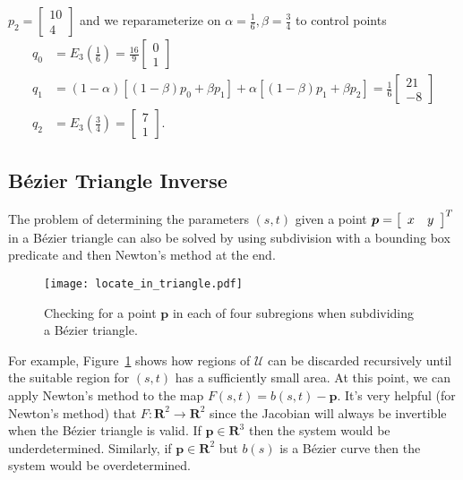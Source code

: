 \documentclass[letterpaper,10pt]{article}
\theoremstyle{definition}
\newcommand{\reals}{\mathbf{R}}
\newcommand{\utri}{\mathcal{U}}
\begin{document}
\(p_2 = \left[ \begin{array}{c} 10 \\ 4 \end{array}\right]\)
and we reparameterize on \(\alpha = \frac{1}{6}, \beta = \frac{3}{4}\) to
control points
\begin{align}
  q_0 &= E_3\left(\frac{1}{6}\right) =
  \frac{16}{9} \left[ \begin{array}{c} 0 \\ 1 \end{array}\right] \\
  q_1 &= (1 - \alpha) \left[(1 - \beta) p_0 + \beta p_1\right] +
   \alpha \left[(1 - \beta) p_1 + \beta p_2\right] = \frac{1}{6} \left[
    \begin{array}{c} 21 \\ -8 \end{array}\right] \\
  q_2 &= E_3\left(\frac{3}{4}\right) = \left[
    \begin{array}{c} 7 \\ 1 \end{array}\right].
\end{align}

\subsection{B\'{e}zier Triangle Inverse}

The problem of determining the parameters \((s, t)\) given a point
\(\bm{p} = \left[\begin{array}{c c} x & y\end{array}\right]^T\)
in a B\'{e}zier triangle can also be solved by using
subdivision with a bounding box predicate and then Newton's method
at the end.

\begin{figure}
  \texttt{[image: locate\_in\_triangle.pdf]}
  \centering
  \captionsetup{width=.75\linewidth}
  \caption{Checking for a point \(\bm{p}\) in each of four subregions
    when subdividing a B\'{e}zier triangle.}
  \label{fig:locate-in-triangle}
\end{figure}

For example, Figure~\ref{fig:locate-in-triangle} shows
how regions of \(\utri\) can be discarded recursively until the
suitable region for \((s, t)\) has a sufficiently small area. At
this point, we can apply Newton's method to the map \(F(s, t) =
b(s, t) - \bm{p}\). It's very helpful (for Newton's method) that
\(F: \reals^2 \longrightarrow \reals^2\) since the Jacobian will
always be invertible
when the B\'{e}zier triangle is valid. If \(\bm{p} \in \reals^3\)
then the system would be underdetermined. Similarly, if
\(\bm{p} \in \reals^2\) but \(b(s)\) is a B\'{e}zier curve then the
system would be overdetermined.
\end{document}
